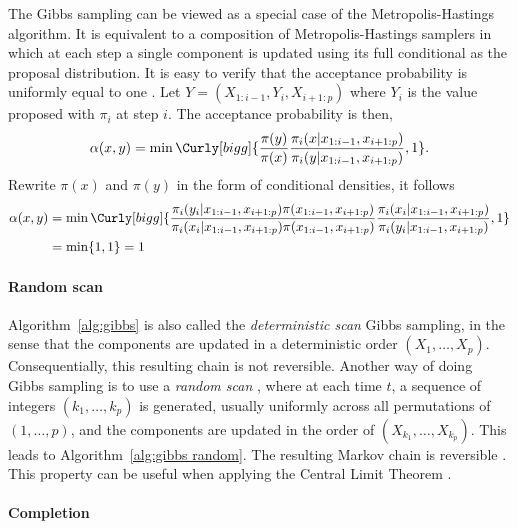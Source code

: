 The Gibbs sampling can be viewed as a special case of the Metropolis-Hastings algorithm. It is equivalent to a composition of Metropolis-Hastings samplers in which at each step a single component is updated using its full conditional as the proposal distribution. It is easy to verify that the acceptance probability is uniformly equal to one \cite[][Theorem~10.13]{Robert:2004tn}. Let $Y = (X_{1:i-1},Y_i,X_{i+1:p})$ where $Y_i$ is the value proposed with $\pi_i$ at step $i$. The acceptance probability is then,
\begin{equation*}
  \alpha(x,y) = \min\Curly[bigg]{
    \frac{\pi(y)}{\pi(x)}
    \frac{\pi_i(x|x_{1:i-1},x_{i+1:p})}{\pi_i(y|x_{1:i-1},x_{i+1:p})},1}.
\end{equation*}
Rewrite $\pi(x)$ and $\pi(y)$ in the form of conditional densities, it follows
\begin{align*}
  \alpha(x,y) &= \min\Curly[bigg]{
    \frac{\pi_i(y_i|x_{1:i-1}, x_{i+1:p})\pi(x_{1:i-1},x_{i+1:p})}
    {\pi_i(x_i|x_{1:i-1}, x_{i+1:p})\pi(x_{1:i-1},x_{i+1:p})}
    \frac{\pi_i(x_i|x_{1:i-1}, x_{i+1:p})}{\pi_i(y_i|x_{1:i-1}, x_{i+1:p})},1}
    \\
  &= \min\{1,1\} = 1
\end{align*}

\paragraph{Random scan}

Algorithm~\ref{alg:gibbs} is also called the \emph{deterministic scan} Gibbs sampling, in the sense that the components are updated in a deterministic order $(X_1,\dots,X_p)$. Consequentially, this resulting chain is not reversible. Another way of doing Gibbs sampling is to use a \emph{random scan} \cite{Liu1995Gibbs}, where at each time $t$, a sequence of integers $(k_1,\dots,k_p)$ is generated, usually uniformly across all permutations of $(1,\dots,p)$, and the components are updated in the order of $(X_{k_1},\dots,X_{k_p})$. This leads to Algorithm~\ref{alg:gibbs random}. The resulting Markov chain is reversible \cite{Liu1995Gibbs}. This property can be useful when applying the Central Limit Theorem \cite[][sec.~10.1.2]{Robert:2004tn}.



\paragraph{Completion}

